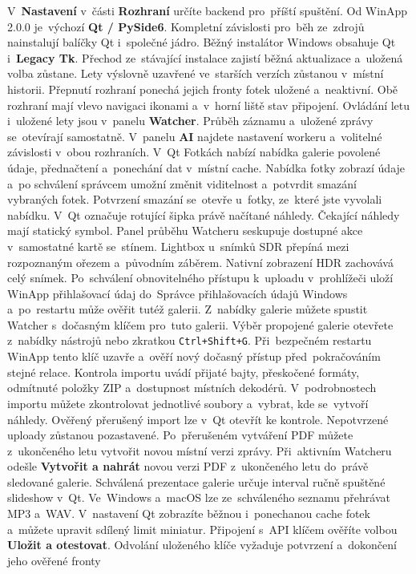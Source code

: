 \documentclass[11pt,a4paper]{article}
\newcommand{\ui}[1]{\textbf{#1}}
\newcommand{\codeword}[1]{\nolinkurl{#1}}
\begin{document}
V~\ui{Nastavení} v~části \ui{Rozhraní} určíte backend pro~příští spuštění.
Od WinApp 2.0.0 je~výchozí \ui{Qt / PySide6}.
Kompletní závislosti pro~běh ze~zdrojů nainstalují balíčky Qt i~společné jádro.
Běžný instalátor Windows obsahuje Qt i~\ui{Legacy Tk}.
Přechod ze~stávající instalace zajistí běžná aktualizace a~uložená volba zůstane.
Lety výslovně uzavřené ve~starších verzích zůstanou v~místní historii.
Přepnutí rozhraní ponechá jejich fronty fotek uložené a~neaktivní.
Obě rozhraní mají vlevo navigaci ikonami a~v~horní liště stav připojení.
Ovládání letu i~uložené lety jsou v~panelu \ui{Watcher}.
Průběh záznamu a~uložené zprávy se~otevírají samostatně. V~panelu \ui{AI}
najdete nastavení workeru a~volitelné závislosti v~obou rozhraních.
V~Qt Fotkách nabízí nabídka galerie povolené údaje, přednačtení
a~ponechání dat v~místní cache. Nabídka fotky zobrazí údaje a~po schválení
správcem umožní změnit viditelnost a~potvrdit smazání vybraných fotek.
Potvrzení smazání se~otevře u~fotky, ze~které jste vyvolali nabídku.
V~Qt označuje rotující šipka právě načítané náhledy. Čekající náhledy mají
statický symbol. Panel průběhu Watcheru seskupuje dostupné akce v~samostatné
kartě se~stínem.
Lightbox u~snímků SDR přepíná mezi rozpoznaným ořezem a~původním záběrem.
Nativní zobrazení HDR zachovává celý snímek.
Po~schválení obnovitelného přístupu k~uploadu v~prohlížeči uloží WinApp
přihlašovací údaj do~Správce přihlašovacích údajů Windows a~po~restartu může
ověřit tutéž galerii.
Z~nabídky galerie můžete spustit Watcher s~dočasným klíčem pro~tuto galerii.
Výběr propojené galerie otevřete z~nabídky nástrojů nebo zkratkou
\codeword{Ctrl+Shift+G}.
Při~bezpečném restartu WinApp tento klíč uzavře a~ověří nový dočasný
přístup před~pokračováním stejné relace.
Kontrola importu uvádí přijaté bajty, přeskočené formáty, odmítnuté položky ZIP
a~dostupnost místních dekodérů. V~podrobnostech importu můžete zkontrolovat
jednotlivé soubory a~vybrat, kde se~vytvoří náhledy.
Ověřený přerušený import lze v~Qt otevřít ke kontrole. Nepotvrzené uploady
zůstanou pozastavené. Po~přerušeném vytváření PDF můžete z~ukončeného letu
vytvořit novou místní verzi zprávy.
Při~aktivním Watcheru odešle \ui{Vytvořit a nahrát} novou verzi PDF
z~ukončeného letu do~právě sledované galerie.
Schválená prezentace galerie určuje interval ručně spuštěné slideshow v~Qt.
Ve~Windows a~macOS lze ze~schváleného seznamu přehrávat MP3 a~WAV.
V~nastavení Qt zobrazíte běžnou i~ponechanou cache fotek a~můžete upravit
sdílený limit miniatur.
Připojení s~API klíčem ověříte volbou \ui{Uložit a otestovat}.
Odvolání uloženého klíče vyžaduje potvrzení a~dokončení jeho ověřené fronty
\end{document}
